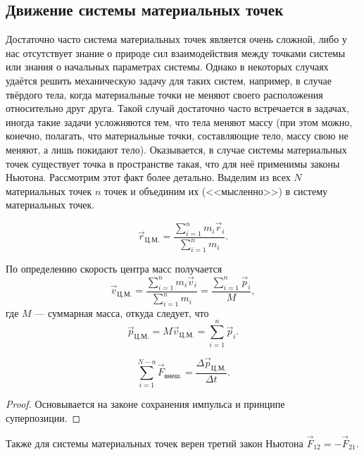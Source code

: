 \subsection{Движение системы материальных точек}
Достаточно часто система материальных точек является очень сложной, либо
у нас отсутствует знание о природе сил взаимодействия между точками системы
или знания о начальных параметрах системы. Однако в некоторых случаях
удаётся решить механическую задачу для таких систем, например, в случае
твёрдого тела, когда материальные точки не меняют своего расположения относительно друг друга.
Такой случай достаточно часто встречается в задачах, иногда
такие задачи усложняются тем, что тела меняют массу (при этом можно, конечно, полагать,
что материальные точки, составляющие тело, массу свою не меняют, а лишь покидают тело).
Оказывается, в случае системы материальных точек существует точка в пространстве такая, что
для неё применимы законы Ньютона. Рассмотрим этот факт более детально.
Выделим из всех $N$ материальных точек $n$ точек и объединим их (<<мысленно>>) в систему материальных точек.
\begin{definition}
$$\vec{r}_\text{Ц.М.} = \frac{\sum\limits_{i=1}^{n}m_i \vec{r}_i}{\sum\limits_{i=1}^{n} m_i}.$$
\label{def:cm}
\end{definition}
По определению скорость центра масс получается
$$\vec{v}_\text{Ц.М.} = \frac{\sum\limits_{i=1}^{n}m_i \vec{v}_i}{\sum\limits_{i=1}^{n} m_i}
= \frac{\sum\limits_{i=1}^{n} \vec{p}_i}{M},$$
где $M$ --- суммарная масса, откуда следует, что
$$\vec{p}_\text{Ц.М.} = M \vec{v}_\text{Ц.М.}
= {\sum\limits_{i=1}^{n} \vec{p}_i}.$$
\begin{theorem}
$$\sum\limits_{i=1}^{N-n}\vec{F}_\text{внеш.} = \frac{\Delta \vec{p}_\text{Ц.М.}}{\Delta t}.$$
\label{th:2nd_Newton_system}
\begin{proof}
Основывается на законе сохранения импульса и принципе суперпозиции.
\end{proof}
\end{theorem}
Также для системы материальных точек верен третий закон Ньютона $\vec{F}_{12} = - \vec{F}_{21}.$
